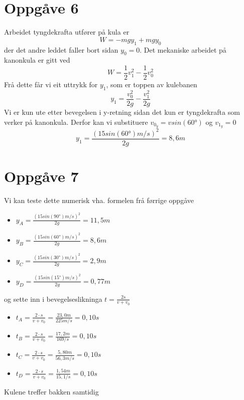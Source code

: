 \documentclass[12pt,a4paper]{article}
\begin{document}
  \section*{Oppgåve 6}
    Arbeidet tyngdekrafta utfører på kula er
    \begin{equation}
      W = -mgy_1 + mgy_0
    \end{equation}
    der det andre leddet faller bort sidan $y_0 = 0$. Det mekaniske arbeidet på kanonkula
    er gitt ved
    \begin{equation}
      W = \frac{1}{2}v_1^2 - \frac{1}{2}v_0^2
    \end{equation}
    Frå dette får vi eit uttrykk for $y_1$, som er toppen av kulebanen
    \begin{equation}
      y_1 = \frac{v_0^2}{2g} - \frac{v_1^2}{2g}
    \end{equation}
    Vi er kun ute etter bevegelsen i y-retning sidan det kun er tyngdekrafta som verker
    på kanonkula. Derfor kan vi substituere $v_{0_y} = vsin(\ang{60})$ og $v_{1_y} = 0$
    \begin{equation}
      y_1 = \frac{(15sin(\ang{60})m/s)^2}{2g} = 8,6m
    \end{equation}


  \section*{Oppgåve 7}
    Vi kan teste dette numerisk vha. formelen frå førrige oppgåve
    \begin{itemize}
      \item $y_A = \frac{(15sin(\ang{90})m/s)^2}{2g} = 11,5m$
      \item $y_B = \frac{(15sin(\ang{60})m/s)^2}{2g} = 8,6m$
      \item $y_C = \frac{(15sin(\ang{30})m/s)^2}{2g} = 2,9m$
      \item $y_D = \frac{(15sin(\ang{15})m/s)^2}{2g} = 0,77m$
    \end{itemize}
    og sette inn i bevegelseslikninga $t=\frac{2s}{v+v_0}$
    \begin{itemize}
      \item $t_A = \frac{2\cdot s}{v+v_0} = \frac{23,0m}{225m/s} = 0,10s$
      \item $t_B = \frac{2\cdot s}{v+v_0} = \frac{17,2m}{169/s} = 0,10s$
      \item $t_C = \frac{2\cdot s}{v+v_0} = \frac{5,80m}{56,3m/s} = 0,10s$
      \item $t_D = \frac{2\cdot s}{v+v_0} = \frac{1,54m}{15,1/s} = 0,10s$
    \end{itemize}
    Kulene treffer bakken samtidig
\end{document}
